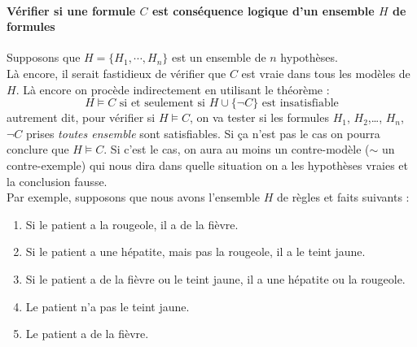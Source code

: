 


\paragraph{Vérifier si une formule $C$ est conséquence logique d'un ensemble $H$ de formules}
Supposons que $H=\{H_1,\cdots,H_n\}$ est un ensemble de $n$ hypothèses.\\
Là encore, il serait fastidieux de vérifier que $C$ est vraie dans tous les modèles de $H$. Là encore on procède indirectement en utilisant le théorème : 
\[H\models C \mbox{ si et seulement si } H\cup\{\neg C\}\mbox{ est insatisfiable}\]
autrement dit, pour vérifier si $H\models C$, on va tester si les formules $H_1$, $H_2$,\ldots, $H_n$, $\neg C$ prises \emph{toutes ensemble} sont satisfiables. Si ça n'est pas le cas on pourra conclure que $H\models C$. Si c'est le cas, on aura au moins un contre-modèle ($\sim$ un contre-exemple) qui nous dira dans quelle situation on a les hypothèses vraies et la conclusion fausse.\\



\noindent Par exemple, supposons que nous avons l'ensemble $H$ de règles et faits suivants :

\begin{enumerate}
\item Si le patient a la rougeole, il a de la fièvre.
\item Si le patient a une hépatite, mais pas la rougeole, il a le teint jaune.
\item Si le patient a de la fièvre ou le teint jaune, il a une hépatite ou la rougeole.
\item Le patient n’a pas le teint jaune.
\item Le patient a de la fièvre.
\end{enumerate}

